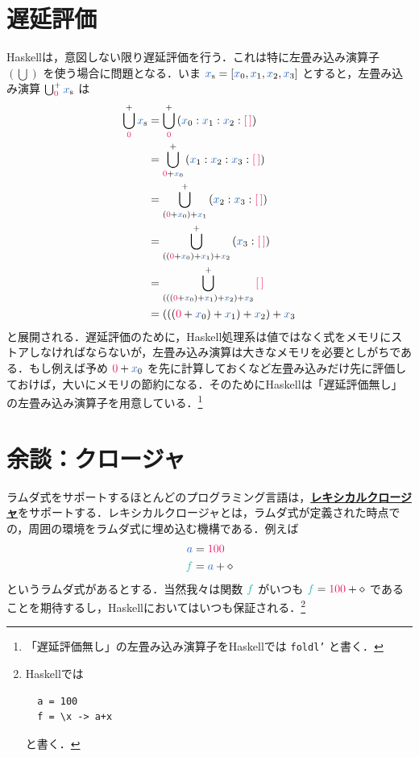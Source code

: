 \documentclass[a5paper,twoside,fleqn,draft]{jsbook}
\def\constantColor{WildStrawberry}
\def\varColor{NavyBlue}
\def\funcColor{BlueGreen}
\newcommand{\programminglanguage}[1]{\textsf{#1}}
\newcommand{\haskell}{\programminglanguage{Haskell}}
\newcommand{\keyword}[1]{{\underline{\textbf{#1}}}}
\newcommand{\code}[1]{\texttt{#1}}
\newcommand{\mConstant}[1]{\textcolor{\constantColor}{#1}}
\newcommand{\mZeroNumber}{{\mConstant{0}}}
\newcommand{\mEmptyList}{{\textcolor{\constantColor}{[\,]}}}
\newcommand{\mVar}[1]{\textcolor{\varColor}{#1}}
\newcommand{\mAnonParam}{\diamond}
\newcommand{\mAVar}{{\mVar{a}}}
\newcommand{\mXVar}{\mVar{x}}
\newcommand{\mFunc}[1]{\textcolor{\funcColor}{#1}}
\newcommand{\mFFunc}{{\mFunc{f}}}
\DeclareMathOperator*{\mFold}{\bigcup}
\newcommand{\mList}[1]{\mVar{#1}_\mathrm{s}}
\begin{document}
\section{遅延評価}

\haskell は，意図しない限り遅延評価を行う．これは特に左畳み込み演算子 $(\mFold)$ を使う場合に問題となる．いま $\mList{x}=[\mXVar_0,\mXVar_1,\mXVar_2,\mXVar_3]$ とすると，左畳み込み演算 $\mFold^+_\mZeroNumber\mList{x}$ は
\begin{align}
  \mFold^+_\mZeroNumber\mList{x}
  &=\mFold^+_\mZeroNumber{}(\mXVar_0:\mXVar_1:\mXVar_2:\mEmptyList)\\
  &=\mFold^+_{\mZeroNumber+\mXVar_0}{}(\mXVar_1:\mXVar_2:\mXVar_3:\mEmptyList)\\
  &=\mFold^+_{(\mZeroNumber+\mXVar_0)+\mXVar_1}{}(\mXVar_2:\mXVar_3:\mEmptyList)\\
  &=\mFold^+_{((\mZeroNumber+\mXVar_0)+\mXVar_1)+\mXVar_2}{}(\mXVar_3:\mEmptyList)\\
  &=\mFold^+_{(((\mZeroNumber+\mXVar_0)+\mXVar_1)+\mXVar_2)+\mXVar_3}{}\mEmptyList\\
  &=(((\mZeroNumber+\mXVar_0)+\mXVar_1)+\mXVar_2)+\mXVar_3
\end{align}
と展開される．遅延評価のために，\haskell 処理系は値ではなく式をメモリにストアしなければならないが，左畳み込み演算は大きなメモリを必要としがちである．もし例えば予め $\mZeroNumber+\mXVar_0$ を先に計算しておくなど左畳み込みだけ先に評価しておけば，大いにメモリの節約になる．そのために\haskell は「遅延評価無し」の左畳み込み演算子を用意している．\footnote{「遅延評価無し」の左畳み込み演算子を\haskell では \code{foldl'} と書く．}

%

\section{余談：クロージャ}

ラムダ式をサポートするほとんどのプログラミング言語は，\keyword{レキシカルクロージャ}をサポートする．レキシカルクロージャとは，ラムダ式が定義された時点での，周囲の環境をラムダ式に埋め込む機構である．例えば
\begin{align}
  \mAVar
  &=\mConstant{100}\\
  \mFFunc
  &=\mAVar+\mAnonParam
\end{align}
というラムダ式があるとする．当然我々は関数 $\mFFunc$ がいつも $\mFFunc=\mConstant{100}+\mAnonParam$ であることを期待するし，\haskell においてはいつも保証される．\footnote{\haskell では
\begin{verbatim}
  a = 100
  f = \x -> a+x
\end{verbatim}
と書く．}
\end{document}
